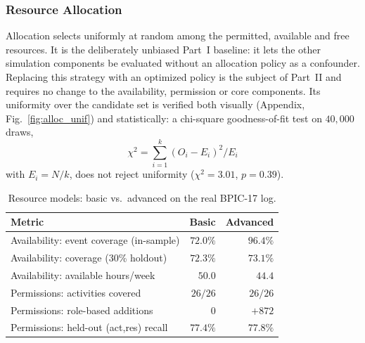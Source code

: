 \subsubsection{Resource Allocation}
Allocation selects uniformly at random among the permitted, available and free
resources. It is the deliberately unbiased Part~I baseline: it lets the other
simulation components be evaluated without an allocation policy as a confounder.
Replacing this strategy with an optimized policy is the subject of Part~II and
requires no change to the availability, permission or core components. Its
uniformity over the candidate set is verified both visually (Appendix,
Fig.~\ref{fig:alloc_unif}) and statistically: a chi-square goodness-of-fit test on
$40{,}000$ draws, 
\[
\chi^2=\sum_{i=1}^{k}(O_i-E_i)^2/E_i 
\]
with $E_i=N/k$, does not reject
uniformity ($\chi^2=3.01$, $p=0.39$).

\begin{table}[!h]
    \caption{Resource models: basic vs.\ advanced on the real BPIC-17 log.}
    \centering
    \renewcommand{\arraystretch}{1.2}
    \footnotesize
    \begin{tabular}{lrr}
        \toprule
        \textbf{Metric} & \textbf{Basic} & \textbf{Advanced} \\
        \midrule
        Availability: event coverage (in-sample)  & $72.0\%$ & $96.4\%$ \\
        Availability: coverage (30\% holdout)      & $72.3\%$ & $73.1\%$ \\
        Availability: available hours/week          & $50.0$   & $44.4$ \\
        Permissions: activities covered             & $26/26$  & $26/26$ \\
        Permissions: role-based additions           & $0$      & $+872$ \\
        Permissions: held-out (act,res) recall      & $77.4\%$ & $77.8\%$ \\
        \bottomrule
    \end{tabular}
    \label{tab:resource_eval}
\end{table}
